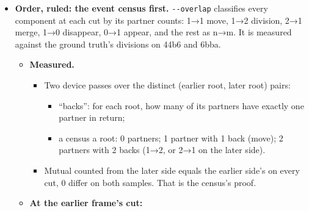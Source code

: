 \begin{itemize}
\begin{itemize}
\item Theirs: \texttt{core/\allowbreak{}links.\allowbreak{}py}.

\begin{itemize}
\item Positions: \texttt{find\_\allowbreak{}futures}, \texttt{find\_\allowbreak{}pasts}, \texttt{find\_\allowbreak{}single\_\allowbreak{}future}, \texttt{find\_\allowbreak{}single\_\allowbreak{}past}.
\item Appear and disappear: \texttt{find\_\allowbreak{}appeared\_\allowbreak{}positions}, \texttt{find\_\allowbreak{}disappeared\_\allowbreak{}positions}.
\item Tracks: \texttt{get\_\allowbreak{}track}, \texttt{find\_\allowbreak{}all\_\allowbreak{}descending\_\allowbreak{}tracks}, \texttt{find\_\allowbreak{}all\_\allowbreak{}tracks\_\allowbreak{}in\_\allowbreak{}same\_\allowbreak{}lineage}, \texttt{find\_\allowbreak{}starting\_\allowbreak{}tracks}, \texttt{find\_\allowbreak{}ending\_\allowbreak{}tracks}, \texttt{find\_\allowbreak{}all\_\allowbreak{}tracks\_\allowbreak{}in\_\allowbreak{}time\_\allowbreak{}point}.
\item Data attached to links and lineages: \texttt{get\_\allowbreak{}link\_\allowbreak{}data}, \texttt{find\_\allowbreak{}all\_\allowbreak{}links\_\allowbreak{}with\_\allowbreak{}data}, \texttt{get\_\allowbreak{}lineage\_\allowbreak{}data}.
\end{itemize}
\item Ours to build: the same queries over our track graph, in one module behind one request struct, with the exact fields as link data.
\end{itemize}
\item \textbf{Order, ruled: the event census first.} \texttt{-\allowbreak{}-\allowbreak{}overlap} classifies every component at each cut by its partner counts: 1→1 move, 1→2 division, 2→1 merge, 1→0 disappear, 0→1 appear, and the rest as n→m. It is measured against the ground truth's divisions on 44b6 and 6bba.

\begin{itemize}
\item \textbf{Measured.}

\begin{itemize}
\item Two device passes over the distinct (earlier root, later root) pairs:

\begin{itemize}
\item “backs”: for each root, how many of its partners have exactly one partner in return;
\item a census a root: 0 partners; 1 partner with 1 back (move); 2 partners with 2 backs (1→2, or 2→1 on the later side).
\end{itemize}
\item Mutual counted from the later side equals the earlier side's on every cut, 0 differ on both samples. That is the census's proof.
\end{itemize}
\item \textbf{At the earlier frame's cut:}


\end{itemize}
\end{itemize}
